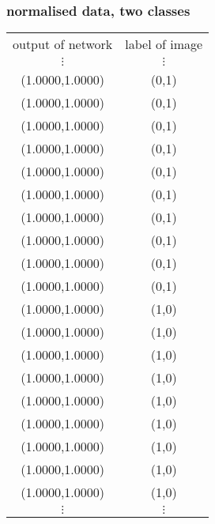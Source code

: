\subsubsection{ normalised data, two classes}

\begin{tabular}{cc}
output of network & label of image \\
$\vdots$ & $\vdots$ \\
(1.0000,1.0000) & (0,1)  \\
(1.0000,1.0000) & (0,1)  \\
(1.0000,1.0000) & (0,1)  \\
(1.0000,1.0000) & (0,1)  \\
(1.0000,1.0000) & (0,1)  \\
(1.0000,1.0000) & (0,1)  \\
(1.0000,1.0000) & (0,1)  \\
(1.0000,1.0000) & (0,1)  \\
(1.0000,1.0000) & (0,1)  \\
(1.0000,1.0000) & (0,1)  \\
(1.0000,1.0000) & (1,0)  \\
(1.0000,1.0000) & (1,0)  \\
(1.0000,1.0000) & (1,0)  \\
(1.0000,1.0000) & (1,0)  \\
(1.0000,1.0000) & (1,0)  \\
(1.0000,1.0000) & (1,0)  \\
(1.0000,1.0000) & (1,0)  \\
(1.0000,1.0000) & (1,0)  \\
(1.0000,1.0000) & (1,0)  \\
$\vdots$ & $\vdots$ 
\end{tabular}
